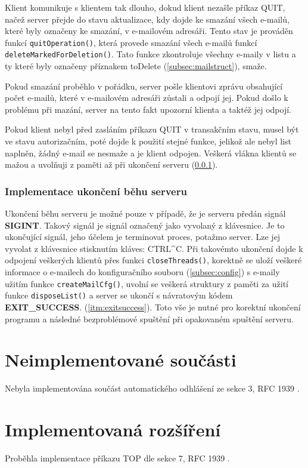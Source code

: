 \documentclass[11pt,a4paper]{report}
\begin{document}
    Klient komunikuje s klientem tak dlouho, dokud klient nezašle příkaz QUIT, načež server přejde do stavu aktualizace, kdy dojde ke smazání všech e-mailů, které byly označeny ke smazání, v e-mailovém adresáři. Tento stav je prováděn funkcí \texttt{quitOperation()}, která provede smazání všech e-mailů funkcí \texttt{deleteMarkedForDeletion()}. Tato funkce zkontroluje všechny e-maily v listu a ty které byly označeny příznakem toDelete (\ref{subsec:mailstruct}), smaže.\par
    Pokud smazání proběhlo v pořádku, server pošle klientovi zprávu obsahující počet e-mailů, které v e-mailovém adresáři zůstali a odpojí jej. Pokud došlo k problému při mazání, server na tento fakt upozorní klienta a taktéž jej odpojí.\par
    Pokud klient nebyl před zasláním příkazu QUIT v transakčním stavu, musel být ve stavu autorizačním, poté dojde k použití stejné funkce, jelikož ale nebyl list naplněn, žádný e-mail se nesmaže a je klient odpojen.
    Veškerá vlákna klientů se mažou a uvolňuji z paměti až při ukončení serveru (\ref{subsec:sigint}).
    \subsubsection{Implementace ukončení běhu serveru}
    \label{subsec:sigint}
    Ukončení běhu serveru je možné pouze v případě, že je serveru předán signál \textbf{SIGINT}. Takový signál je signál označený jako vyvolaný z klávesnice. Je to ukončující signál, jeho účelem je terminovat proces, potažmo server. Lze jej vyvolat z klávesnice stisknutím kláves: CTRL\^{}C. Při takovémto ukončení dojde k odpojení veškerých klientů přes funkci \texttt{closeThreads()}, korektně se uloží veškeré informace o e-mailech do konfiguračního souboru (\ref{subsec:config}) s e-maily užitím funkce \texttt{createMailCfg()}, uvolní se veškerá struktury z paměti za užití funkce \texttt{disposeList()} a server se ukončí s návratovým kódem \textbf{EXIT\_SUCCESS}. (\ref{itm:exitsuccess}). Toto vše je nutné pro korektní ukončení programu a následné bezproblémové spuštění při opakovaném spuštění serveru.
    \clearpage
    \section{Neimplementované součásti}
    \label{sec:nonimplementedsections}
    Nebyla implementována součást automatického odhlášení ze sekce 3, RFC 1939 \cite{POP3}.
    \section{Implementovaná rozšíření}
    \label{sec:implementedsections}
    Proběhla implementace příkazu TOP dle sekce 7, RFC 1939 \cite{POP3}.
    
    
\end{document}
